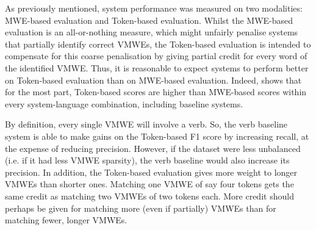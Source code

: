 \documentclass[output=paper
,modfonts
,nonflat,draftmode]{langsci/langscibook}
\begin{document}

As previously mentioned, system performance was measured on two modalities: MWE-based evaluation and Token-based evaluation. Whilst the MWE-based evaluation is an all-or-nothing measure, which might unfairly penalise systems that partially identify correct VMWEs, the Token-based evaluation is intended to compensate for this coarse penalisation by giving partial credit for every word of the identified VMWE. Thus, it is reasonable to expect systems to perform better on Token-based evaluation than on MWE-based evaluation. Indeed,  shows that for the most part, Token-based scores are higher than MWE-based scores within every system-language combination, including baseline systems.

By definition, every single VMWE will involve a verb. So, the verb baseline system is able to make gains on the Token-based F1 score by increasing recall, at the expense of reducing precision. However, if the dataset were less unbalanced (i.e. if it had less VMWE sparsity), the verb baseline would also increase its precision. In addition, the Token-based evaluation gives more weight to longer VMWEs than shorter ones. Matching one VMWE of say four tokens gets the same credit as matching two VMWEs of two tokens each. More credit should perhaps be given for matching more (even if partially) VMWEs than for matching fewer, longer VMWEs. 

\end{document}
